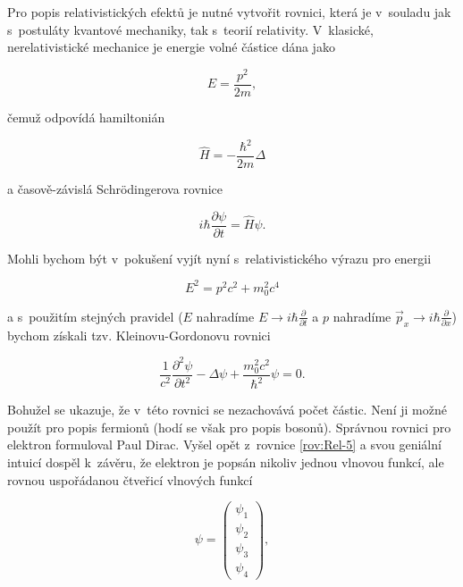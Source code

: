 Pro popis relativistických efektů je nutné vytvořit rovnici, která je v~souladu jak s~postuláty kvantové mechaniky, tak s~teorií relativity. V~klasické, nerelativistické mechanice je energie volné částice dána jako

\begin{equation}
E = \frac{p^2}{2m},
\label{rov:Rel-2}
\end{equation}
  
\noindent čemuž odpovídá hamiltonián 

\begin{equation}
\hat{H} = - \frac{\hbar^2}{2m} \Delta
\label{rov:Rel-3}
\end{equation}

\noindent a časově-závislá Schr\"odingerova rovnice 

\begin{equation}
i \hbar \frac{\partial \psi}{\partial t} = \hat{H} \psi.
\label{rov:Rel-4}
\end{equation}

Mohli bychom být v~pokušení vyjít nyní s~relativistického výrazu pro energii

\begin{equation}
E^2 = p^2 c^2 + m_0^2 c^4
\label{rov:Rel-5}
\end{equation}

\noindent a s~použitím stejných pravidel ($E$ nahradíme $E \rightarrow i \hbar \frac{\partial}{\partial t}$ a $p$ nahradíme $\vec{p}_x \rightarrow i \hbar \frac{\partial}{\partial x}$) bychom získali tzv. Kleinovu-Gordonovu rovnici

\begin{equation}
\frac{1}{c^2} \frac{\partial^2 \psi}{\partial t^2} - \Delta \psi + \frac{m_0^2 c^2}{\hbar^2} \psi = 0.
\label{rov:Rel-6}
\end{equation}

Bohužel se ukazuje, že v~této rovnici se nezachovává počet částic. Není ji možné použít pro popis fermionů (hodí se však pro popis bosonů). Správnou rovnici pro elektron formuloval Paul Dirac. Vyšel opět z~rovnice \eqref{rov:Rel-5} a svou geniální intuicí dospěl k~závěru, že elektron je popsán nikoliv jednou vlnovou funkcí, ale rovnou uspořádanou čtveřicí vlnových funkcí

\begin{equation}
\psi = 
\begin{pmatrix}
\psi_1 \\
\psi_2 \\
\psi_3 \\
\psi_4
\end{pmatrix},
\label{rov:Rel-7}
\end{equation}

